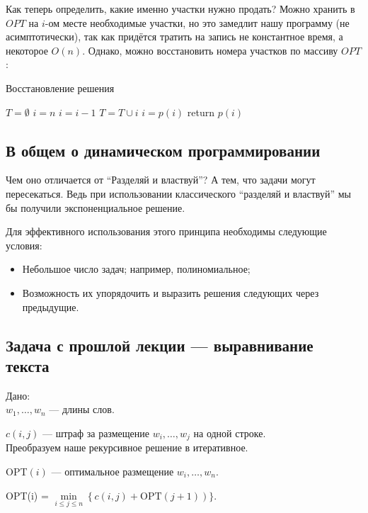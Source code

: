 Как теперь определить, какие именно участки нужно продать?
Можно хранить в $OPT$ на $i$-ом месте необходимые участки, но это замедлит нашу программу (не асимптотически), так как придётся тратить на запись не константное время, а некоторое $O(n)$.
Однако, можно восстановить номера участков по массиву $OPT$:

\begin{algorithm}
	\caption{Восстановление решения}
	\begin{algorithmic}
			\State \(T = \emptyset\)
			\State \(i = n\)
					\State \(i = i - 1\)
				\Else
					\State \(T = T \cup {i}\)
					\State \(i = p(i)\)
				\EndIf
			\EndWhile
			\State return \(p(i)\)
		\EndFunction
	\end{algorithmic}
\end{algorithm}

\subsection{В общем о динамическом программировании}
Чем оно отличается от ``Разделяй и властвуй''? А тем, что задачи могут пересекаться. Ведь при использовании классического ``разделяй и властвуй'' мы бы получили экспоненциальное решение. 

Для эффективного использования этого принципа необходимы следующие условия:
\begin{itemize}
    \item Небольшое число задач; например, полиномиальное;
    \item Возможность их упорядочить и выразить решения следующих через предыдущие.
\end{itemize}

\subsection{Задача с прошлой лекции --- выравнивание текста}

Дано:\\
$w_1,\ldots, w_n$ --- длины слов.

$c(i, j)$ --- штраф за размещение $w_i,\ldots, w_j$ на одной строке.\\

Преобразуем наше рекурсивное решение в итеративное.

OPT$(i)$ --- оптимальное размещение $w_i, \ldots, w_n$.

OPT(i) = $\min\limits_{i\leqslant j\leqslant n} \left\{ c(i, j)+ \mathrm{OPT}(j+1) \right)\}$.\\

